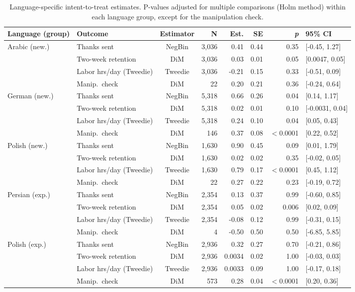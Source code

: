 \begin{table}[ht]
\centering
\small
\caption{Language-specific intent-to-treat estimates. P-values adjusted for multiple comparisons (Holm method) within each language group, except for the manipulation check.}
\label{table:full_itt_language}
\begin{tabular}{llcrrrrl}
\toprule
\textbf{Language (group)} & \textbf{Outcome} & \textbf{Estimator} & \textbf{N} & \textbf{Est.} & \textbf{SE} & \textbf{\textit{p}} & \textbf{95\% CI} \\
\midrule
Arabic (new.) & Thanks sent & NegBin & 3,036 & 0.41 & 0.44 & 0.35 & [-0.45, 1.27] \\
 & Two-week retention & DiM & 3,036 & 0.03 & 0.01 & 0.05 & [0.0047, 0.05] \\
 & Labor hrs/day (Tweedie) & Tweedie & 3,036 & -0.21 & 0.15 & 0.33 & [-0.51, 0.09] \\
 & Manip.\ check & DiM & 22 & 0.20 & 0.21 & 0.36 & [-0.24, 0.64] \\
\addlinespace
German (new.) & Thanks sent & NegBin & 5,318 & 0.66 & 0.26 & 0.04 & [0.14, 1.17] \\
 & Two-week retention & DiM & 5,318 & 0.02 & 0.01 & 0.10 & [-0.0031, 0.04] \\
 & Labor hrs/day (Tweedie) & Tweedie & 5,318 & 0.24 & 0.10 & 0.04 & [0.05, 0.43] \\
 & Manip.\ check & DiM & 146 & 0.37 & 0.08 & $<$0.0001 & [0.22, 0.52] \\
\addlinespace
Polish (new.) & Thanks sent & NegBin & 1,630 & 0.90 & 0.45 & 0.09 & [0.01, 1.79] \\
 & Two-week retention & DiM & 1,630 & 0.02 & 0.02 & 0.35 & [-0.02, 0.05] \\
 & Labor hrs/day (Tweedie) & Tweedie & 1,630 & 0.79 & 0.17 & $<$0.0001 & [0.45, 1.12] \\
 & Manip.\ check & DiM & 22 & 0.27 & 0.22 & 0.23 & [-0.19, 0.72] \\
\addlinespace
Persian (exp.) & Thanks sent & NegBin & 2,354 & 0.13 & 0.37 & 0.99 & [-0.60, 0.85] \\
 & Two-week retention & DiM & 2,354 & 0.05 & 0.02 & 0.006 & [0.02, 0.09] \\
 & Labor hrs/day (Tweedie) & Tweedie & 2,354 & -0.08 & 0.12 & 0.99 & [-0.31, 0.15] \\
 & Manip.\ check & DiM & 4 & -0.50 & 0.50 & 0.50 & [-6.85, 5.85] \\
\addlinespace
Polish (exp.) & Thanks sent & NegBin & 2,936 & 0.32 & 0.27 & 0.70 & [-0.21, 0.86] \\
 & Two-week retention & DiM & 2,936 & 0.0034 & 0.02 & 1.00 & [-0.03, 0.03] \\
 & Labor hrs/day (Tweedie) & Tweedie & 2,936 & 0.0033 & 0.09 & 1.00 & [-0.17, 0.18] \\
 & Manip.\ check & DiM & 573 & 0.28 & 0.04 & $<$0.0001 & [0.20, 0.36] \\
\bottomrule
\end{tabular}
\end{table}
